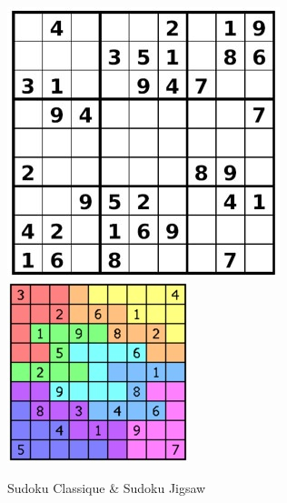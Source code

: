 \documentclass[a4paper,8pt,french,fleqn]{article}
\begin{document}
\begin{figure}[h]
  \begin{center}
    \vspace{0.5cm}
    \includegraphics[scale=0.6]{sudoku.jpg}
    \hspace{1.5cm}
    \includegraphics[scale=0.88]{jigsaw.jpg}
    \caption{Sudoku Classique \& Sudoku Jigsaw}
  \end{center}
\end{figure}
\end{document}
